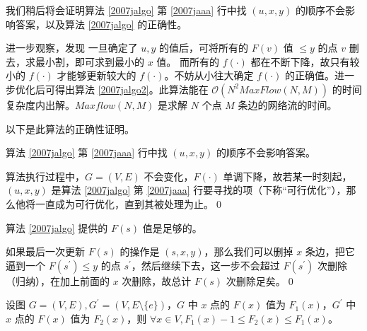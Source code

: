 				我们稍后将会证明算法 \ref{2007jalgo} 第  \ref{2007jaaa} 行中找 $(u, x, y)$ 的顺序不会影响答案，以及算法 \ref{2007jalgo} 的正确性。
				
				进一步观察，发现 一旦确定了 $u, y$ 的值后，可将所有的  $F(v)$ 值 $\le y$ 的点 $v$ 删去，求最小割，即可求到最小的 $x$ 值。
				而所有的 $f(\cdot)$ 都在不断下降，故只有较小的 $f(\cdot)$ 才能够更新较大的 $f(\cdot)$。不妨从小往大确定 $f(\cdot)$ 的正确值。进一步优化后可得出算法 \ref{2007jalgo2}。此算法能在 $\mathcal{O}\left( N^2MaxFlow(N, M) \right)$ 的时间复杂度内出解。$Maxflow(N, M)$ 是求解 $N$ 个点 $M$ 条边的网络流的时间。
				
				以下是此算法的正确性证明。
				\begin{theorem} \label{2007jaaaaa}
						算法 \ref{2007jalgo} 第  \ref{2007jaaa} 行中找 $(u, x, y)$ 的顺序不会影响答案。
				\end{theorem}
				\begin{pf}
					算法执行过程中，$G = (V, E)$ 不会变化，$F(\cdot)$ 单调下降，故若某一时刻起，  $(u, x, y)$  是算法  \ref{2007jalgo} 第  \ref{2007jaaa} 行要寻找的项（下称“可行优化”），那么他将一直成为可行优化，直到其被处理为止。\qed
				\end{pf}
				\begin{theorem}
						算法 \ref{2007jalgo} 提供的 $F(s)$ 值是足够的。
				\end{theorem}
				\begin{pf}
					如果最后一次更新 $F(s)$ 的操作是 $(s, x, y)$，那么我们可以删掉 $x$ 条边，把它逼到一个 $F(s^\prime) \le y$ 的点 $s^\prime$，然后继续下去，这一步不会超过 $F(s^\prime)$ 次删除（归纳），在加上前面的 $x$ 次删除，故总计 $F(s)$ 次删除足矣。\qed
				\end{pf}
				\begin{lemma}
						设图 $G = (V, E), G^\prime = (V, E \setminus \{e\})$，$G$ 中 $x$ 点的 $F(x)$ 值为 $F_1(x)$，$G^\prime$ 中 $x$ 点的 $F(x)$ 值为 $F_2(x)$，则 $\forall x \in V, F_1(x) - 1 \le F_2(x)  \le F_1(x)$。
						\label{2007jlemma}
				\end{lemma}
